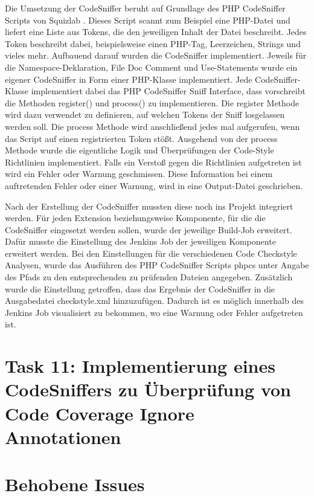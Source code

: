 \documentclass[11pt,a4paper]{article} %
\begin{document}
Die Umsetzung der CodeSniffer beruht auf Grundlage des PHP CodeSniffer Scripts von Squizlab 
\cite{SquizlabPHPCodeSniffer}. Dieses Script scannt zum Beispiel eine PHP-Datei und liefert
eine Liste aus Tokens, die den jeweiligen Inhalt der Datei beschreibt. Jedes Token beschreibt dabei,
beispielsweise einen PHP-Tag, Leerzeichen, Strings und vieles mehr. Aufbauend darauf
wurden die CodeSniffer implementiert. Jeweils für die Namespace-Deklaration, File Doc Comment
und Use-Statements wurde ein eigener CodeSniffer in Form einer PHP-Klasse implementiert.
Jede CodeSniffer-Klasse implementiert dabei das PHP CodeSniffer Sniff Interface, dass vorschreibt
die Methoden register() und process() zu implementieren. Die register Methode wird dazu 
verwendet zu definieren, auf welchen Tokens der Sniff losgelassen werden soll.
Die process Methode wird anschließend jedes mal aufgerufen, wenn das Script auf einen registrierten
Token stößt. Ausgehend von der process Methode wurde die eigentliche Logik und Überprüfungen
der Code-Style Richtlinien implementiert. Falls ein Verstoß gegen die Richtlinien 
aufgetreten ist wird ein Fehler oder Warnung geschmissen.
Diese Information bei einem auftretenden Fehler oder einer Warnung, wird in eine Output-Datei
geschrieben.

Nach der Erstellung der CodeSniffer mussten diese noch ins Projekt integriert werden.
Für jeden Extension beziehungsweise Komponente, für die die CodeSniffer eingesetzt werden sollen,
wurde der jeweilige Build-Job erweitert. Dafür musste die Einstellung des Jenkins Job der jeweiligen 
Komponente erweitert werden. Bei den Einstellungen für die verschiedenen Code Checkstyle Analysen,
wurde das Ausführen des PHP CodeSniffer Scripts phpcs unter Angabe des Pfads zu den entsprechenden zu
prüfenden Dateien angegeben. Zusätzlich wurde die Einstellung getroffen, dass das Ergebnis der CodeSniffer
in die Ausgabedatei checkstyle.xml hinzuzufügen. Dadurch ist es möglich innerhalb des Jenkins Job
visualisiert zu bekommen, wo eine Warnung oder Fehler aufgetreten ist.

\section{Task 11: Implementierung eines CodeSniffers zu Überprüfung von Code Coverage Ignore Annotationen}



\section{Behobene Issues} \label{sec:issues}

\newpage
\end{document}

